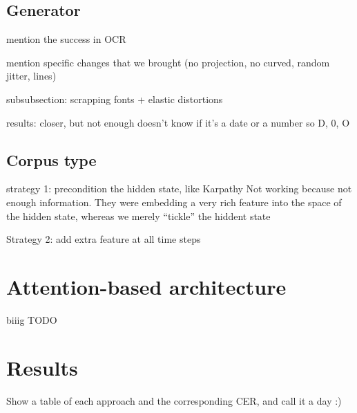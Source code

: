 
	\subsection{Generator}

		mention the success in OCR

		mention specific changes that we brought (no projection, no curved, random jitter, lines)

		subsubsection: scrapping fonts + elastic distortions

		results:  closer, but not enough doesn't know if it's a date or a number so D, 0, O


	\subsection{Corpus type}
		strategy 1: precondition the hidden state, like Karpathy
		Not working because not enough information. They were embedding a very rich feature into the space of the hidden state, whereas we merely ``tickle'' the hiddent state

		Strategy 2: add extra feature at all time steps


\section{Attention-based architecture}\label{sec:attention}
	biiig TODO


\section{Results}\label{sec:transcription_results}

		Show a table of each approach and the corresponding CER, and call it a day :)

\stopToDo{}

